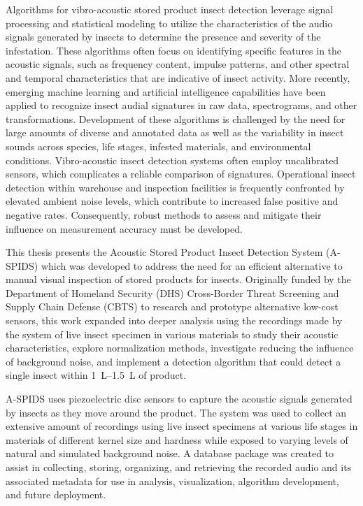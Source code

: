 \documentclass[../Vibro-Acoustic Signatures and Detection Algorithms for Stored Product Insects.tex]{subfiles}
\begin{document}
Algorithms for vibro-acoustic stored product insect detection leverage signal processing and statistical modeling to utilize the characteristics of the audio signals generated by insects to determine the presence and severity of the infestation. These algorithms often focus on identifying specific features in the acoustic signals, such as frequency content, impulse patterns, and other spectral and temporal characteristics that are indicative of insect activity. More recently, emerging machine learning and artificial intelligence capabilities have been applied to recognize insect audial signatures in raw data, spectrograms, and other transformations. Development of these algorithms is challenged by the need for large amounts of diverse and annotated data as well as the variability in insect sounds across species, life stages, infested materials, and environmental conditions. Vibro-acoustic insect detection systems often employ uncalibrated sensors, which complicates a reliable comparison of signatures. Operational insect detection within warehouse and inspection facilities is frequently confronted by elevated ambient noise levels, which contribute to increased false positive and negative rates. Consequently, robust methods to assess and mitigate their influence on measurement accuracy must be developed. 

This thesis presents the  Acoustic Stored Product Insect Detection System (A-SPIDS) which was developed to address the need for an efficient alternative to manual visual inspection of stored products for insects. Originally funded by the Department of Homeland Security (DHS) Cross-Border Threat Screening and Supply Chain Defense (CBTS) to research and prototype alternative low-cost sensors, this work expanded into deeper analysis using the recordings made by the system of live insect specimen in various materials to study their acoustic characteristics, explore normalization methods, investigate reducing the influence of background noise, and implement a detection algorithm that could detect a single insect within \SIrange{1}{1.5}{\liter} of product. 

A-SPIDS uses piezoelectric disc sensors to capture the acoustic signals generated by insects as they move around the product. The system was used to collect an extensive amount of recordings using live insect specimens at various life stages in materials of different kernel size and hardness while exposed to varying levels of natural and simulated background noise. A database package was created to assist in collecting, storing, organizing, and retrieving the recorded audio and its associated metadata for use in analysis, visualization, algorithm development, and future deployment.
\end{document}
